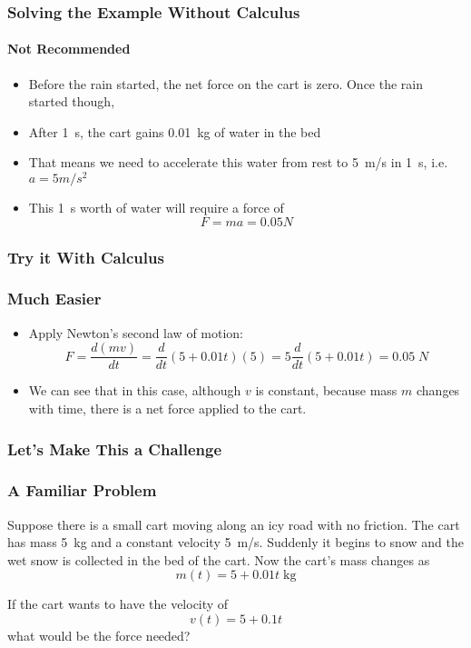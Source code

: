 \documentclass[12pt,compress,aspectratio=169]{beamer}
\begin{document}
\begin{frame}
  \frametitle{Solving the Example Without Calculus}
  \framesubtitle{Not Recommended}
  \begin{itemize}
  \item Before the rain started, the net force on the cart is zero. Once the
    rain started though,
  \item After \SI{1}{\s}, the cart gains \SI{0.01}{\kg} of water in the bed
  \item That means we need to accelerate this water from rest to
    \SI{5}{m/s} in \SI{1}{\s}, i.e.\ $a=5\si{m/s^2}$
  \item This \SI{1}{\s} worth of water will require a force of
    \begin{displaymath}
      F=ma=0.05\si{N}
    \end{displaymath}
  \end{itemize}
\end{frame}


\begin{frame}
  \frametitle{Try it With Calculus}
  \frametitle{Much Easier}
  \begin{itemize}
  \item Apply Newton's second law of motion:
    \begin{displaymath}
      F=\frac{d(mv)}{dt}=\frac{d}{dt}(5+0.01t)(5)=5\frac{d}{dt}(5+0.01t)=
      0.05\;\si{N}
    \end{displaymath}
  \item We can see that in this case, although $v$ is constant, because mass
    $m$ changes with time, there is a net force applied to the cart. 
  \end{itemize}

\end{frame}

\begin{frame}
  \frametitle{Let's Make This a Challenge}
  \frametitle{A Familiar Problem}
  Suppose there is a small cart moving along an icy road with no friction. The
  cart has mass \SI{5}{kg} and a constant velocity \SI{5}{m/s}. Suddenly it
  begins to snow and the wet snow is collected in the bed of the cart. Now the
  cart's mass changes as
  \begin{displaymath}
    m(t)=5+0.01t\;\si{\kg}
  \end{displaymath}

  If the cart wants to have the velocity of
  \begin{displaymath}
    v(t)=5+0.1t
  \end{displaymath}
  what would be the force needed?
\end{frame}
\end{document}
